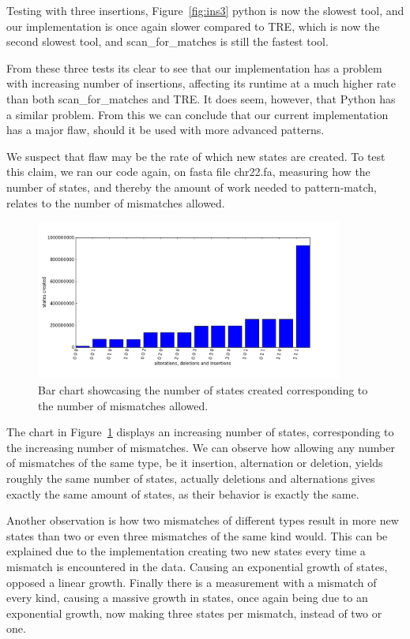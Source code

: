 Testing with three insertions, Figure~\ref{fig:ins3} python is now the slowest tool, and our implementation is once again slower compared to TRE, which is now the second slowest tool, and scan\_for\_matches is still the fastest tool.

From these three tests its clear to see that our implementation has a problem with increasing number of insertions, affecting its runtime at a much higher rate than both scan\_for\_matches and TRE. It does seem, however, that Python has a similar problem. From this we can conclude that our current implementation has a major flaw, should it be used with more advanced patterns.

We suspect that flaw may be the rate of which new states are created. To test this claim, we ran our code again, on fasta file chr22.fa, measuring how the number of states, and thereby the amount of work needed to pattern-match, relates to the number of mismatches allowed.

\begin{figure}[h!]
\centering
\includegraphics[width=0.9\textwidth]{Benchmarking/states_graph.png}
\caption{Bar chart showcasing the number of states created corresponding to the number of mismatches allowed.}
\label{fig:statesgraph}
\end{figure}

The chart in Figure~\ref{fig:statesgraph} displays an increasing number of states, corresponding to the increasing number of mismatches. We can observe how allowing any number of mismatches of the same type, be it insertion, alternation or deletion, yields roughly the same number of states, actually deletions and alternations gives exactly the same amount of states, as their behavior is exactly the same.

Another observation is how two mismatches of different types result in more new states than two or even three mismatches of the same kind would. This can be explained due to the implementation creating two new states every time a mismatch is encountered in the data. Causing an exponential growth of states, opposed a linear growth. Finally there is a measurement with a mismatch of every kind, causing a massive growth in states, once again being due to an exponential growth, now making three states per mismatch, instead of two or one.  


